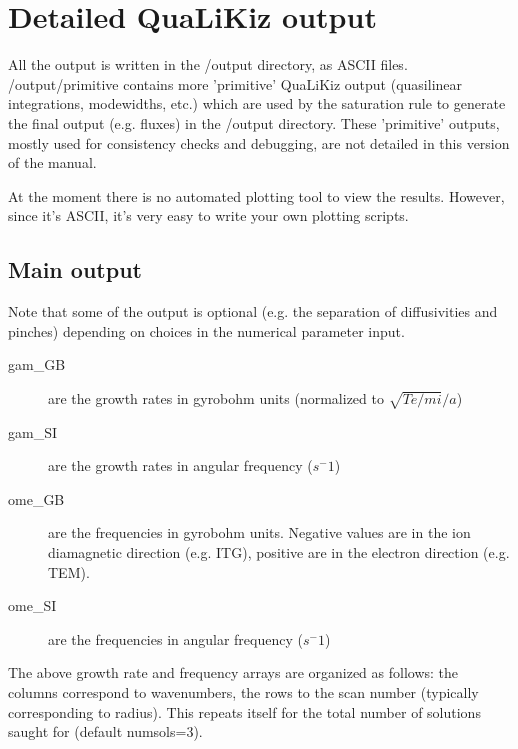\documentclass{article}
\begin{document}
\section{Detailed QuaLiKiz output}

All the output is written in the /output directory, as ASCII files. /output/primitive contains more 'primitive' QuaLiKiz output (quasilinear integrations, modewidths, etc.) which are used by the saturation rule to generate the final output (e.g. fluxes) in the /output directory. These 'primitive' outputs, mostly used for consistency checks and debugging, are not detailed in this version of the manual.

At the moment there is no automated plotting tool to view the results. However, since it's ASCII, it's very easy to write your own plotting scripts. 

\subsection{Main output}
Note that some of the output is optional (e.g. the separation of diffusivities and pinches) depending on choices in the numerical parameter input.
\begin{description} 
\item[gam\_GB] are the growth rates in gyrobohm units (normalized to $\sqrt{Te/mi}/a$)

\item[gam\_SI] are the growth rates in angular frequency ($s^-1$)

\item[ome\_GB] are the frequencies in gyrobohm units. Negative values are in the ion diamagnetic direction (e.g. ITG), positive are in the electron direction (e.g. TEM).

\item[ome\_SI] are the frequencies in angular frequency ($s^-1$)
\end{description} 

The above growth rate and frequency arrays are organized as follows: the columns correspond to wavenumbers, the rows to the scan number (typically corresponding to radius). 
This repeats itself for the total number of solutions saught for (default numsols=3).
\end{document}

